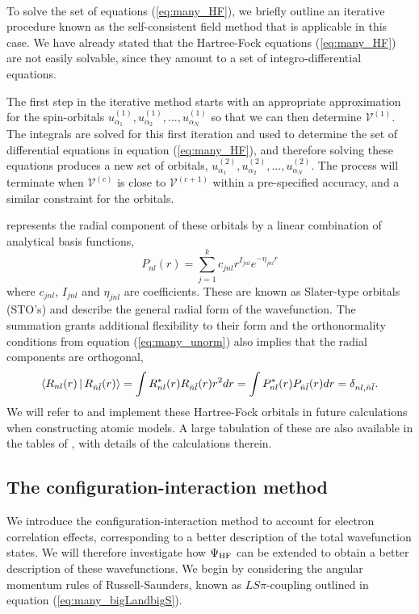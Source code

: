 \\
To solve the set of equations (\ref{eq:many_HF}), we briefly outline an iterative procedure known as the self-consistent field method that is applicable in this case. We have already stated that the Hartree-Fock equations (\ref{eq:many_HF}) are not easily solvable, since they amount to a set of integro-differential equations.

The first step in the iterative method starts with an appropriate approximation for the spin-orbitals $u_{\alpha_1}^{(1)}, u_{\alpha_2}^{(1)}, ... ,u_{\alpha_N}^{(1)}$ so that we can then determine $\mathcal{V}^{(1)}$. The integrals are solved for this first iteration and used to determine the set of differential equations in equation (\ref{eq:many_HF}), and therefore solving these equations produces a new set of orbitals, $u_{\alpha_1}^{(2)}, u_{\alpha_2}^{(2)}, ... , u_{\alpha_N}^{(2)}$. The process will terminate when $\mathcal{V}^{(c)}$ is close to $\mathcal{V}^{(c+1)}$ within a pre-specified accuracy, and a similar constraint for the orbitals.

\citet{1974ADNDT..14..177C} represents the radial component of these orbitals by a linear combination of analytical basis functions,
	\begin{equation}\label{eq:many_boundorbs}
	P_{nl}(r)=\sum_{j=1}^kc_{jnl}r^{I_{jnl}}e^{-\eta_{jnl}r}
	\end{equation}
where $c_{jnl}$, $I_{jnl}$ and $\eta_{jnl}$ are coefficients. These are known as Slater-type orbitals (STO's) and describe the general radial form of the wavefunction. The summation grants additional flexibility to their form and the orthonormality conditions from equation (\ref{eq:many_unorm}) also implies that the radial components are orthogonal,
\begin{equation}\label{eq:many_rnlnorm}
\Braket{R_{nl}(r) | R_{\bar{n}\bar{l}}(r)} = \int R_{nl}^*(r)R_{\bar{n}\bar{l}}(r) r^2dr= \int P_{nl}^*(r)P_{\bar{n}\bar{l}}(r) dr =  \delta_{nl,\bar{n}\bar{l}}.
\end{equation}
We will refer to and implement these Hartree-Fock orbitals in future calculations when constructing atomic models. A large tabulation of these are also available in the tables of \citet{1974ADNDT..14..177C}, with details of the calculations therein.

\subsection{The configuration-interaction method}\label{sec:many_ci}
We introduce the configuration-interaction method to account for electron correlation effects, corresponding to a better description of the total wavefunction states. We will therefore investigate how $\Psi_{{\rm HF}}$ can be extended to obtain a better description of these wavefunctions. We begin by considering the angular momentum rules of Russell-Saunders, known as $LS\pi$-coupling outlined in equation (\ref{eq:many_bigLandbigS}).

